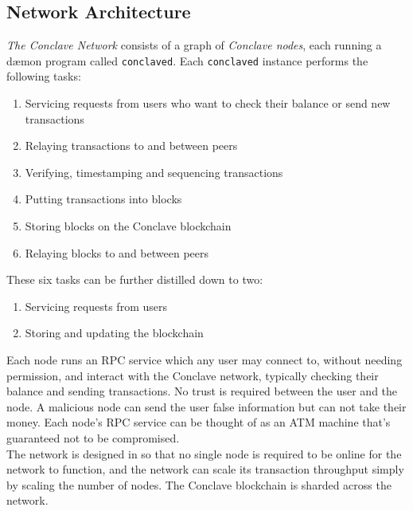 \documentclass{report}
\begin{document}
		\subsection{Network Architecture}
		\textit{The Conclave Network} consists of a graph of \textit{Conclave nodes}, each running a dæmon program called \texttt{conclaved}. Each \texttt{conclaved}  instance performs the following tasks:
		\begin{enumerate}
			\item Servicing requests from users who want to check their balance or send new transactions
			\item Relaying transactions to and between peers
			\item Verifying, timestamping and sequencing transactions
			\item Putting transactions into blocks
			\item Storing blocks on the Conclave blockchain
			\item Relaying blocks to and between peers
		\end{enumerate}
		These six tasks can be further distilled down to two:
		\begin{enumerate}
			\item Servicing requests from users
			\item Storing and updating the blockchain
		\end{enumerate}
		Each node runs an RPC service which any user may connect to, without needing permission, and interact with the Conclave network, typically checking their balance and sending transactions. No trust is required between the user and the node. A malicious node can send the user false information but can not take their money. Each node's RPC service can be thought of as an ATM machine that's guaranteed not to be compromised.  \\
		
		The network is designed in so that no single node is required to be online for the network to function, and the network can scale its transaction throughput simply by scaling the number of nodes. The Conclave blockchain is sharded across the network.
		
\end{document}
